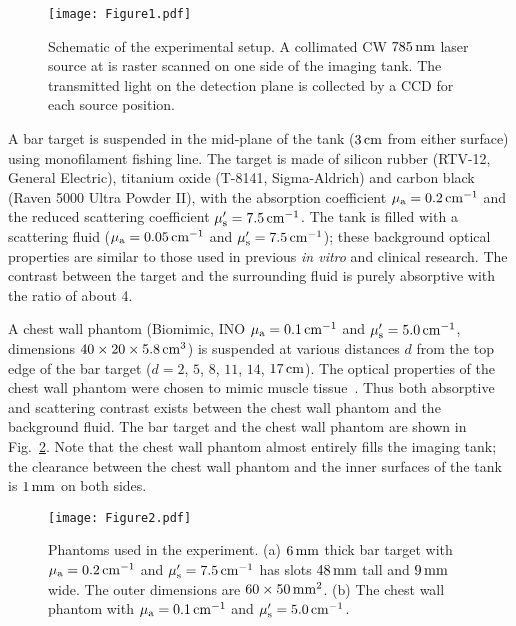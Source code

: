 \begin{figure}[t]
\centering\texttt{[image: Figure1.pdf]}
\caption{\label{fig:schem}
Schematic of the experimental setup. A collimated CW $785\,{\rm nm}$ laser source at is raster scanned on one side of the imaging tank. The transmitted light on the detection plane is collected by a CCD for each source position.}
\end{figure}

A bar target is suspended in the mid-plane of the tank ($3\,{\rm cm}$ from either surface) using monofilament fishing line. The target is made of silicon rubber (RTV-12, General Electric), titanium oxide (T-8141, Sigma-Aldrich) and carbon black (Raven 5000 Ultra Powder II), with the absorption coefficient $\mu_{\rm a}=0.2\,{\rm cm}^{-1}$ and the reduced scattering coefficient $\mu_{\rm s}^\prime = 7.5\,{\rm cm}^{-1}$.  The tank is filled with a scattering fluid ($\mu_{\rm a} = 0.05\,{\rm cm}^{-1}$ and $\mu_{\rm s}^\prime = 7.5\,{\rm cm}^{-1}$); these background optical properties are similar to those used in previous {\em in vitro} and clinical research. The contrast between the target and the surrounding fluid is purely absorptive with the ratio of about 4.

A chest wall phantom (Biomimic, INO $\mu_{\rm a} = 0.1\,{\rm cm}^{-1}$ and $\mu_{\rm s}^\prime = 5.0\,{\rm cm}^{-1}$, dimensions $40\times 20\times 5.8\,{\rm cm}^3$) is suspended at various distances $d$ from the top edge of the bar target ($d=2$, $5$, $8$, $11$, $14$, $17\,{\rm cm}$). The optical properties of the chest wall phantom were chosen to mimic muscle tissue~\cite{ardeshirpour_10_1, kienle_99_1,taroni_03_1}.  Thus both absorptive and scattering contrast exists between the chest wall
phantom and the background fluid. The bar target and the chest wall phantom are shown in Fig.~\ref{fig:targets}.  Note that the chest wall phantom almost entirely fills the imaging tank; the clearance between the chest wall phantom and the inner surfaces of the tank is $1\,{\rm mm}$ on both sides.

\begin{figure}[t]
\centering\texttt{[image: Figure2.pdf]}
\caption{\label{fig:targets}
Phantoms used in the experiment. (a) $6\,{\rm mm}$ thick bar target with $\mu_{\rm a}=0.2\,{\rm cm}^{-1}$ and $\mu_{\rm s}^{\prime}=7.5\,{\rm cm}^{-1}$ has slots $48\,{\rm mm}$ tall and $9\,{\rm mm}$ wide. The outer dimensions are $60\times 50\,{\rm mm}^2$. (b) The chest wall phantom with $\mu_{\rm a}=0.1\,{\rm cm}^{-1}$ and $\mu_{\rm s}^{\prime}=5.0\,{\rm cm}^{-1}$.  }
\end{figure}


